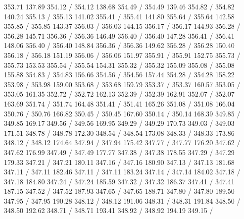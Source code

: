 { 353.71 137.89 354.12 /
 354.12 138.68 354.49 /
 354.49 139.46 354.82 /
 354.82 140.24 355.13 /
 355.13 141.02 355.41 /
 355.41 141.80 355.64 /
 355.64 142.58 355.85 /
 355.85 143.37 356.03 /
 356.03 144.15 356.17 /
 356.17 144.93 356.28 /
 356.28 145.71 356.36 /
 356.36 146.49 356.40 /
 356.40 147.28 356.41 /
 356.41 148.06 356.40 /
 356.40 148.84 356.36 /
 356.36 149.62 356.28 /
 356.28 150.40 356.18 /
 356.18 151.19 356.06 /
 356.06 151.97 355.91 /
 355.91 152.75 355.73 /
 355.73 153.53 355.54 /
 355.54 154.31 355.32 /
 355.32 155.09 355.08 /
 355.08 155.88 354.83 /
 354.83 156.66 354.56 /
 354.56 157.44 354.28 /
 354.28 158.22 353.98 /
 353.98 159.00 353.68 /
 353.68 159.79 353.37 /
 353.37 160.57 353.05 /
 353.05 161.35 352.72 /
 352.72 162.13 352.39 /
 352.39 162.91 352.07 /
 352.07 163.69 351.74 /
 351.74 164.48 351.41 /
 351.41 165.26 351.08 /
 351.08 166.04 350.76 /
 350.76 166.82 350.45 /
 350.45 167.60 350.14 /
 350.14 168.39 349.85 /
 349.85 169.17 349.56 /
 349.56 169.95 349.29 /
 349.29 170.73 349.03 /
 349.03 171.51 348.78 /
 348.78 172.30 348.54 /
 348.54 173.08 348.33 /
 348.33 173.86 348.12 /
 348.12 174.64 347.94 /
 347.94 175.42 347.77 /
 347.77 176.20 347.62 /
 347.62 176.99 347.49 /
 347.49 177.77 347.38 /
 347.38 178.55 347.29 /
 347.29 179.33 347.21 /
 347.21 180.11 347.16 /
 347.16 180.90 347.13 /
 347.13 181.68 347.11 /
 347.11 182.46 347.11 /
 347.11 183.24 347.14 /
 347.14 184.02 347.18 /
 347.18 184.80 347.24 /
 347.24 185.59 347.32 /
 347.32 186.37 347.41 /
 347.41 187.15 347.52 /
 347.52 187.93 347.65 /
 347.65 188.71 347.80 /
 347.80 189.50 347.95 /
 347.95 190.28 348.12 /
 348.12 191.06 348.31 /
 348.31 191.84 348.50 /
 348.50 192.62 348.71 /
 348.71 193.41 348.92 /
 348.92 194.19 349.15 /
}
